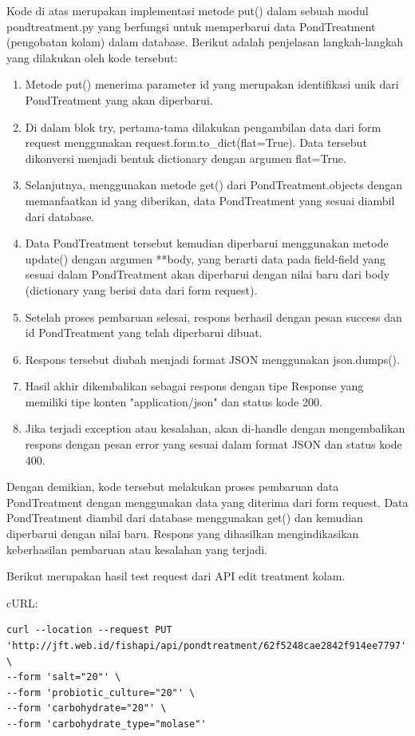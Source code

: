 \begin{enumerate}[1.]
Kode di atas merupakan implementasi metode put() dalam sebuah modul pondtreatment.py yang berfungsi untuk memperbarui data PondTreatment (pengobatan kolam) dalam database. Berikut adalah penjelasan langkah-langkah yang dilakukan oleh kode tersebut:

\begin{enumerate}
\item Metode put() menerima parameter id yang merupakan identifikasi unik dari PondTreatment yang akan diperbarui.
\item Di dalam blok try, pertama-tama dilakukan pengambilan data dari form request menggunakan request.form.to\_dict(flat=True). Data tersebut dikonversi menjadi bentuk dictionary dengan argumen flat=True.
\item Selanjutnya, menggunakan metode get() dari PondTreatment.objects dengan memanfaatkan id yang diberikan, data PondTreatment yang sesuai diambil dari database.
\item Data PondTreatment tersebut kemudian diperbarui menggunakan metode update() dengan argumen **body, yang berarti data pada field-field yang sesuai dalam PondTreatment akan diperbarui dengan nilai baru dari body (dictionary yang berisi data dari form request).
\item Setelah proses pembaruan selesai, respons berhasil dengan pesan success dan id PondTreatment yang telah diperbarui dibuat.
\item Respons tersebut diubah menjadi format JSON menggunakan json.dumps().
\item Hasil akhir dikembalikan sebagai respons dengan tipe Response yang memiliki tipe konten "application/json" dan status kode 200.
\item Jika terjadi exception atau kesalahan, akan di-handle dengan mengembalikan respons dengan pesan error yang sesuai dalam format JSON dan status kode 400.
\end{enumerate}
Dengan demikian, kode tersebut melakukan proses pembaruan data PondTreatment dengan menggunakan data yang diterima dari form request. Data PondTreatment diambil dari database menggunakan get() dan kemudian diperbarui dengan nilai baru. Respons yang dihasilkan mengindikasikan keberhasilan pembaruan atau kesalahan yang terjadi.

Berikut merupakan hasil test request dari API edit treatment kolam.

cURL:

\begin{lstlisting}
curl --location --request PUT 'http://jft.web.id/fishapi/api/pondtreatment/62f5248cae2842f914ee7797' \
--form 'salt="20"' \
--form 'probiotic_culture="20"' \
--form 'carbohydrate="20"' \
--form 'carbohydrate_type="molase"'
\end{lstlisting}


\end{enumerate}
